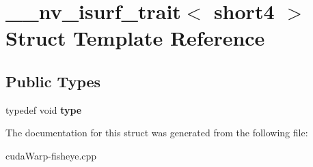 \hypertarget{struct____nv__isurf__trait_3_01short4_01_4}{}\section{\+\_\+\+\_\+nv\+\_\+isurf\+\_\+trait$<$ short4 $>$ Struct Template Reference}
\label{struct____nv__isurf__trait_3_01short4_01_4}
\subsection*{Public Types}
\begin{DoxyCompactItemize}
\item 
typedef void {\bfseries type}\hypertarget{struct____nv__isurf__trait_3_01short4_01_4_a959c4d36990ad9029b1f2e017390cf27}{}\label{struct____nv__isurf__trait_3_01short4_01_4_a959c4d36990ad9029b1f2e017390cf27}

\end{DoxyCompactItemize}


The documentation for this struct was generated from the following file\+:\begin{DoxyCompactItemize}
\item 
cuda\+Warp-\/fisheye.\+cpp\end{DoxyCompactItemize}
